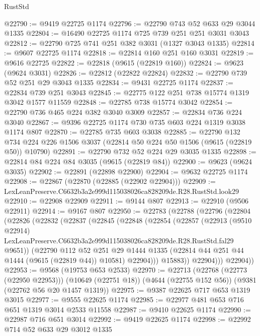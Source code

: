 \begin{lexlean}{RustStd}
\begin{coremodule}
@22790 := @9419 @22725 @1174
@22796 := @22790 @743 @52 @633 @29 @3044 @1335
@22804 := @16490 @22725 @1174 @725 @739 @251 @251 @3031 @3043
@22812 := @22790 @725 @741 @251 @382 @3031 (@1327 @3043 @1335)
@22814 := @9607 @22725 @1174
@22818 := @22814 @160 @251 @160 @3031
@22819 := @9616 @22725
@22822 := @22818 (@9615 (@22819 @160))
@22824 := @9623 (@9624 @3031)
@22826 := @22812 (@22822 @22824)
@22832 := @22790 @739 @52 @251 @29 @3043 @1335
@22834 := @9431 @22725 @1174
@22837 := @22834 @739 @251 @3043
@22845 := @22775 @122 @251 @738 @15774 @1319 @3042 @1577 @11559
@22848 := @22785 @738 @15774 @3042
@22854 := @22790 @736 @465 @224 @382 @3040 @3009
@22857 := @22834 @736 @224 @3040
@22867 := @9396 @22725 @1174 @730 @735 @603 @224 @1319 @3038 @1174 @807
@22870 := @22785 @735 @603 @3038
@22885 := @22790
    @132
    @734
    @224
    @226
    @1506
    @3037
    (@22814 @50 @224 @50 @1506 (@9615 (@22819 @50)) @10790)
@22891 := @22790 @732 @52 @224 @29 @3035 @1335
@22898 := @22814 @84 @224 @84 @3035 (@9615 (@22819 @84))
@22900 := @9623 (@9624 @3035)
@22902 := @22891 (@22898 @22900)
@22904 := @9632 @22725 @1174
@22908 := @22867 (@22870 (@22885 (@22902 @22904)))
@22909 := LexLeanPreserve.C6632b3a2e999d115038026ca828209de.R28.RustStd.look29
@22910 := @22908 @22909
@22911 := @9144 @807
@22913 := @22910 (@9506 @22911)
@22914 := @9167 @807
@22950 := @22783
    (@22788
      (@22796
        (@22804
          (@22826
            (@22832
              (@22837
                (@22845
                  (@22848
                    (@22854
                      (@22857
                        (@22913
                          (@9510 @22914)
                          LexLeanPreserve.C6632b3a2e999d115038026ca828209de.R28.RustStd.fal29
                          @9651))
                      (@22790
                        @112
                        @52
                        @251
                        @29
                        @1444
                        @1335
                        (@22814 @44 @251 @44 @1444 (@9615 (@22819 @44)) @10581)
                        @22904)))
                  @15883))
              @22904)))
        @22904))
@22953 := @9568 (@19753 @653 @2533)
@22970 := @22713
    (@22768 (@22773 (@22950 @22953)))
    (@10649 (@22751 @18))
    (@4644 (@22755 @152 @56))
    (@9381 (@22762 @56 @20 @1457 @1319))
@22975 := @9387 @22625 @717 @653 @1319 @3015
@22977 := @9555 @22625 @1174
@22985 := @22977 @481 @653 @716 @651 @1319 @3014 @2533 @11558
@22987 := @9410 @22625 @1174
@22990 := @22987 @716 @651 @3014
@22992 := @9419 @22625 @1174
@22998 := @22992 @714 @52 @633 @29 @3012 @1335

\end{coremodule}
\end{lexlean}
